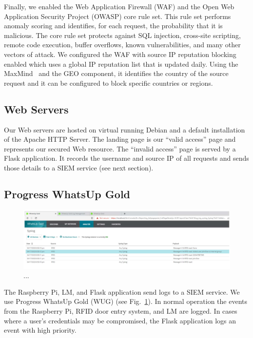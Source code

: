 Finally, we enabled the Web Application Firewall (WAF) and the Open
Web Application Security Project (OWASP) core rule set.  This rule set
performs anomaly scoring and identifies, for each request, the
probability that it is malicious.  The core rule set protects against
SQL injection, cross-site scripting, remote code execution, buffer
overflows, known vulnerabilities, and many other vectors of attack.
We configured the WAF with source IP reputation blocking enabled which
uses a global IP reputation list that is updated daily. Using the
MaxMind~\cite{maxmind-xx} and the GEO component, it identifies the
country of the source request and it can be configured to block
specific countries or regions.

\subsection{Web Servers}

Our Web servers are hosted on virtual running Debian and a default
installation of the Apache HTTP Server.  The landing page is our
``valid access'' page and represents our secured Web resource.  The
``invalid access'' page is served by a Flask application.  It records
the username and source IP of all requests and sends those details to
a SIEM service (see next section).

\subsection{Progress WhatsUp Gold}\label{sec:wug}

\begin{figure}
  \centerline{\includegraphics[width=\textwidth]{img/whatsup-gold}}
  \caption{...}\label{fig:whatsup-gold}
\end{figure}

The Raspberry Pi, LM, and Flask application send logs to a SIEM
service.  We use Progress WhatsUp Gold (WUG) (see
Fig.~\ref{fig:whatsup-gold}).  In normal operation the events from the
Raspberry Pi, RFID door entry system, and LM are logged.  In cases
where a user's credentials may be compromised, the Flask application
logs an event with high priority.
